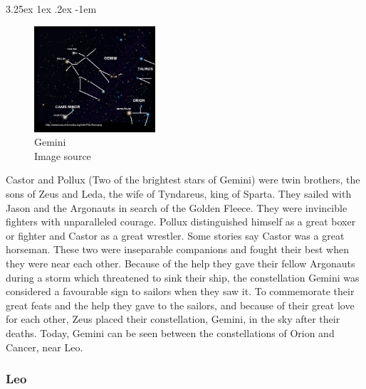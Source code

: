 \documentclass[a4paper,twoside,11pt]{article}
\makeatletter
\numberwithin{equation}{section}
\renewcommand\paragraph{\@startsection{paragraph}{5}{\z@}%
  {3.25ex \@plus1ex \@minus.2ex}%
  {-1em}%
  {\normalfont\normalsize\bfseries}}
\makeatother
\begin{document}
\paragraph{}
\begin{figure}[h]
\centering
\includegraphics[width=0.4\textwidth]{fig22.jpg}
\caption{Gemini \\ Image source \cite{Gem}}
\label{fig22}
\end{figure}
Castor and Pollux (Two of the brightest stars of Gemini) were twin brothers, the sons of Zeus and Leda, the wife of Tyndareus, king of Sparta. They sailed with Jason and the Argonauts in search of the Golden Fleece. They were invincible fighters with unparalleled courage. Pollux distinguished himself as a great boxer or fighter and Castor as a great wrestler. Some stories say Castor was a great horseman. These two were inseparable companions and fought their best when they were near each other. Because of the help they gave their fellow Argonauts during a storm which threatened to sink their ship, the constellation Gemini was considered a favourable sign to sailors when they saw it. To commemorate their great feats and the help they gave to the sailors, and because of their great love for each other, Zeus placed their constellation, Gemini, in the sky after their deaths. Today, Gemini can be seen between the constellations of Orion and Cancer, near Leo.

\subsubsection{Leo}
\end{document}

